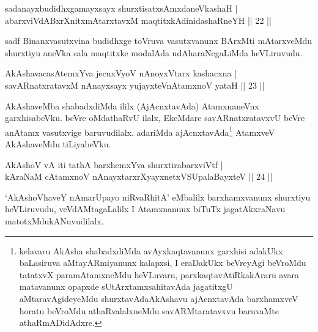 
\begin{shl}
sadanayxbudidhxgamayxsayx shurxtisatxsAmxdaneVkashaH |\\
abarxviVdABxrXnitxmAtarxtavxM maqtitxkAdinidashaRneYH \hfill || 22 ||
\end{shl}

\begin{artha}
sadf Binanxvasutxvina budidhxge toVruva vasutxvanunx BArxMti mAtarxveMdu shurxtiyu aneVka sala maqtitxke modalAda udAharaNegaLiMda heVLiruvudu.
\end{artha}


\begin{shl}
AkAshavacasA\s \s temxYva jecnxVyoV nAnoyxV\s tarx kashacxna |\\
savARnatxratavxM nAnayxsayx yujayxteV\s nAtamxnoV yataH \hfill || 23 ||
\end{shl}

\begin{artha}
AkAshaveMba shabadxdiMda ililx (AjAcnxtavAda) AtamxnaneVnx garxhisabeVku. beVre oMdathaRvU ilalx, EkeMdare savARnatxratavxvU beVre anAtamx vasutxvige baruvudilalx. adariMda ajAcnxtavAda\footnote{kelavaru AkAsha shabadxdiMda avAyxkaqtavanunx garxhisi adakUkx baLasiruva aMtayARmiyanunx kalapxsi, I eraDakUkx beVreyAgi beVroMdu tatatxvX paramAtamxneMdu heVLuvaru, parxkaqtavAtiRkakAraru avara matavanunx opapxde sUtArxtamxsahitavAda jagatitxgU aMtaravAgideyeMdu shurxtavAda\break AkAshavu ajAcnxtavAda barxhamxveV horatu beVroMdu athaRvalalxneMdu savARMtaratavxvu baruvaMte athaRmADidAdxre.} AtamxveV AkAshaveMdu tiLiyabeVku.
\end{artha}


\begin{shl}
AkAshoV vA iti tathA barxhemxYva shurxtirabarxviVtf |\\
kAraNaM cA\s \s tamxnoV nAnayxtarxrXyayxnetxVSUpalaBayxteV \hfill || 24 ||
\end{shl}

\begin{artha}
`AkAshoVhaveY nAmarUpayo niRvaRhitA' eMbalilx barxhamxvanunx shurxtiyu heVLiruvudu, veVdAMtagaLalilx I Atamxnanunx biTuTx jagatAkxraNavu matotxMdu\break kANuvudilalx.
\end{artha}

